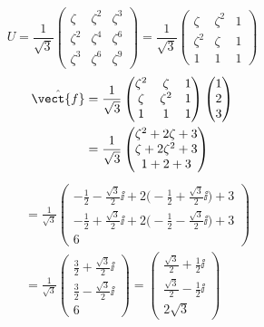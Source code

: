 \[
  U=\frac{1}{\sqrt{3}}\left(\begin{smallmatrix}\zeta&\zeta^{2}&\zeta^{3}\\\zeta^{2}&\zeta^{4}&\zeta^{6}\\\zeta^{3}&\zeta^{6}&\zeta^{9}\end{smallmatrix}\right)
  =\frac{1}{\sqrt{3}}\left(\begin{smallmatrix}\zeta&\zeta^{2}&1\\\zeta^{2}&\zeta&1\\1&1&1\end{smallmatrix}\right)
\]
\begin{align*}
  \hat{\vect{f}}&=\frac{1}{\sqrt{3}}\begin{pmatrix}\zeta^{2}&\zeta&1\\\zeta&\zeta^{2}&1\\1&1&1\end{pmatrix}\begin{pmatrix}1\\2\\3\end{pmatrix}\\
  &=\frac{1}{\sqrt{3}}\begin{pmatrix}\zeta^{2}+2\zeta+3\\\zeta+2\zeta^{2}+3\\1+2+3\end{pmatrix}
\end{align*}
\begin{align*}
  &=\frac{1}{\sqrt{3}}\begin{pmatrix}-\frac{1}{2}-\frac{\sqrt{3}}{2}\ii+2\bigl(-\frac{1}{2}+\frac{\sqrt{3}}{2}\ii\bigr)+3\\-\frac{1}{2}+\frac{\sqrt{3}}{2}\ii+2\bigl(-\frac{1}{2}-\frac{\sqrt{3}}{2}\ii\bigr)+3\\6\end{pmatrix}\\
  &=\frac{1}{\sqrt{3}}\begin{pmatrix}\frac{3}{2}+\frac{\sqrt{3}}{2}\ii\\\frac{3}{2}-\frac{\sqrt{3}}{2}\ii\\6\end{pmatrix}
  =\begin{pmatrix}\frac{\sqrt{3}}{2}+\frac{1}{2}\ii\\\frac{\sqrt{3}}{2}-\frac{1}{2}\ii\\2\sqrt{3}\end{pmatrix}
\end{align*}
